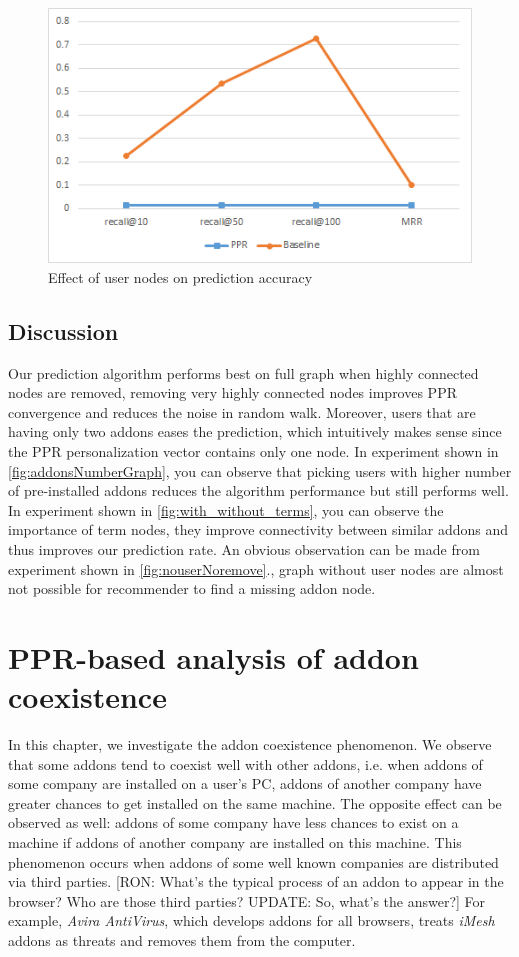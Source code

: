 \documentclass[11pt,oneside]{book}
\let\Oldsection\section
\renewcommand{\section}{\FloatBarrier\Oldsection}
\begin{document}
\begin{figure}[h]
\centering
\includegraphics[scale=.8,angle=0]{figures/nouserNoremove.png}
\caption{Effect of user nodes on prediction accuracy}
\label{fig:nouserNoremove}
\end{figure}


\section{Discussion}
Our prediction algorithm performs best on full graph when highly connected nodes are removed, removing very highly connected nodes improves PPR convergence and reduces the noise in random walk.
Moreover, users that are having only two addons eases the prediction, which intuitively makes sense since the PPR personalization vector contains only one node. In experiment shown in \autoref{fig:addonsNumberGraph}, you can observe that picking users with higher number of pre-installed addons reduces the algorithm performance but still performs well. In experiment shown in \autoref{fig:with_without_terms}, you can observe the importance of term nodes, they improve connectivity between similar addons and thus improves our prediction rate. An obvious observation can be made from experiment shown in \autoref{fig:nouserNoremove}., graph without user nodes are almost not possible for recommender to find a missing addon node.




\chapter{PPR-based analysis of addon coexistence}
\label{chap:Symbiosis}

In this chapter, we investigate the addon coexistence phenomenon. We observe that some addons tend to coexist well with other addons, i.e. when addons of some company are installed on a user's PC, addons of another company have greater chances to get installed on the same machine. The opposite effect can be observed as well: addons of some company have less chances to exist on a machine if addons of another company are installed on this machine. This phenomenon occurs when addons of some well known companies are distributed via third parties. [RON: What's the typical process of an addon to appear in the browser? Who are those third parties? UPDATE: So, what's the answer?] For example, \emph{Avira AntiVirus}, which develops addons for all browsers, treats \emph{iMesh} addons as threats and removes them from the computer.
\end{document}

